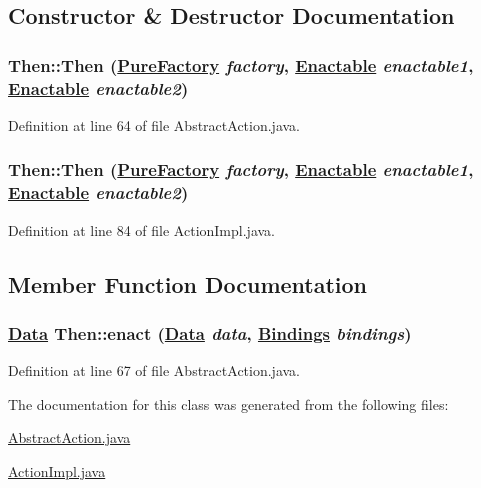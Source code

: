 \subsection{Constructor \& Destructor Documentation}
\hypertarget{classThen_a0}{
\subsubsection[Then]{\setlength{\rightskip}{0pt plus 5cm}Then::Then (\hyperlink{classPureFactory}{Pure\-Factory} {\em factory}, \hyperlink{interfaceEnactable}{Enactable} {\em enactable1}, \hyperlink{interfaceEnactable}{Enactable} {\em enactable2})}}
\label{classThen_a0}




Definition at line 64 of file Abstract\-Action.java.\hypertarget{classThen_a2}{
\subsubsection[Then]{\setlength{\rightskip}{0pt plus 5cm}Then::Then (\hyperlink{classPureFactory}{Pure\-Factory} {\em factory}, \hyperlink{interfaceEnactable}{Enactable} {\em enactable1}, \hyperlink{interfaceEnactable}{Enactable} {\em enactable2})}}
\label{classThen_a2}




Definition at line 84 of file Action\-Impl.java.

\subsection{Member Function Documentation}
\hypertarget{classThen_a1}{
\subsubsection[enact]{\setlength{\rightskip}{0pt plus 5cm}\hyperlink{interfaceData}{Data} Then::enact (\hyperlink{interfaceData}{Data} {\em data}, \hyperlink{interfaceBindings}{Bindings} {\em bindings})}}
\label{classThen_a1}




Definition at line 67 of file Abstract\-Action.java.

The documentation for this class was generated from the following files:\begin{CompactItemize}
\item 
\hyperlink{AbstractAction_8java-source}{Abstract\-Action.java}\item 
\hyperlink{ActionImpl_8java-source}{Action\-Impl.java}\end{CompactItemize}

